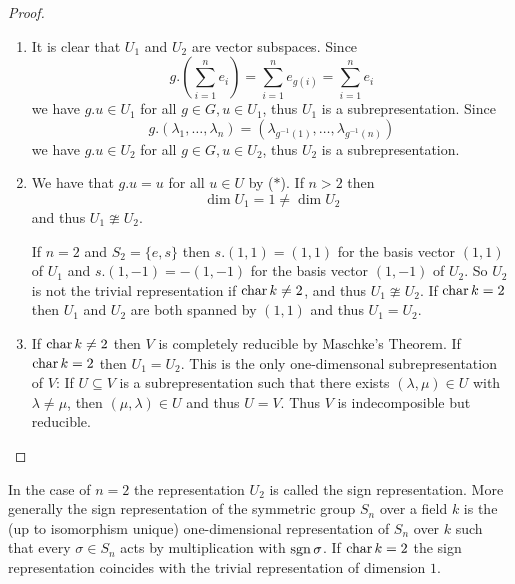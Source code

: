\begin{proof}
  \begin{enumerate}[label=\emph{\alph*)},leftmargin=*]
    \item
      It is clear that $U_1$ and $U_2$ are vector subspaces. Since
      \[
          g.\left(\sum_{i=1}^n e_i\right)
        = \sum_{i=1}^n e_{g(i)}
        = \sum_{i=1}^n e_i
          \tag{$\ast$}
      \]
      we have $g.u \in U_1$ for all $g \in G, u \in U_1$, thus $U_1$ is a subrepresentation. Since
      \[
          g.(\lambda_1, \dotsc, \lambda_n)
        = \left( \lambda_{g^{-1}(1)}, \dotsc, \lambda_{g^{-1}(n)} \right)
      \]
      we have $g.u \in U_2$ for all $g \in G, u \in U_2$, thus $U_2$ is a subrepresentation.
    \item
      We have that $g.u = u$ for all $u \in U$ by ($\ast$).
      If $n > 2$ then
      \[
              \dim U_1
        =     1
        \neq  \dim U_2
      \]
      and thus $U_1 \ncong U_2$.
      
      If $n = 2$ and $S_2 = \{e,s\}$ then $s.(1,1) = (1,1)$ for the basis vector $(1,1)$ of $U_1$ and $s.(1,-1) = -(1,-1)$ for the basis vector $(1,-1)$ of $U_2$.
      So $U_2$ is not the trivial representation if $\operatorname{char} k \neq 2$, and thus $U_1 \ncong U_2$.
      If $\operatorname{char} k = 2$ then $U_1$ and $U_2$ are both spanned by $(1,1)$ and thus $U_1 = U_2$.
    \item
      If $\operatorname{char} k \neq 2$ then $V$ is completely reducible by Maschke’s Theorem.
      If $\operatorname{char} k = 2$ then $U_1 = U_2$.
      This is the only one-dimensonal subrepresentation of $V$:
      If $U \subseteq V$ is a subrepresentation such that there exists $(\lambda, \mu) \in U$ with $\lambda \neq \mu$, then $(\mu, \lambda) \in U$ and thus $U = V$.
      Thus $V$ is indecomposible but reducible.
    \qedhere
  \end{enumerate}
\end{proof}


\begin{rem}
  In the case of $n = 2$ the representation $U_2$ is called the sign representation.
  More generally the sign representation of the symmetric group $S_n$ over a field $k$ is the (up to isomorphism unique) one-dimensional representation of $S_n$ over $k$ such that every $\sigma \in S_n$ acts by multiplication with $\operatorname{sgn} \sigma$.
  If $\operatorname{char} k = 2$ the sign representation coincides with the trivial representation of dimension $1$.
\end{rem}




